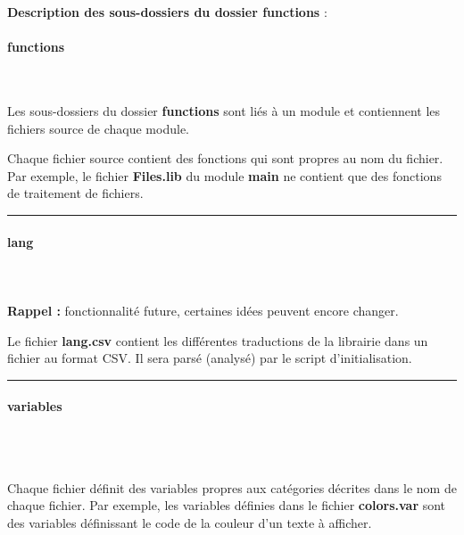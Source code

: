 \documentclass[a4paper,10pt]{article}
\begin{document}
\textbf{Description des sous-dossiers du dossier \textbf{functions}} :

\setcounter{secnumdepth}{4}
\paragraph{functions}\mbox{}\\

\begin{justify}
    Les sous-dossiers du dossier \textbf{functions} sont liés à un module et contiennent les fichiers source de chaque module.
\end{justify}

\begin{justify}
    Chaque fichier source contient des fonctions qui sont propres au nom du fichier. Par exemple, le fichier \textbf{\color{lime}Files.lib} du module \textbf{main} ne contient que des fonctions de traitement de fichiers.
\end{justify}


\par\noindent\rule{\textwidth}{0.4pt}

\paragraph{lang}\mbox{}\\\mbox{}\\

\textbf{Rappel :} fonctionnalité future, certaines idées peuvent encore changer.

\begin{justify}
    Le fichier \textbf{\color{lime}lang.csv} contient les différentes traductions de la librairie dans un fichier au format CSV. Il sera parsé (analysé) par le script d'initialisation.
\end{justify}


\par\noindent\rule{\textwidth}{0.4pt}

\paragraph{variables}\mbox{}\\\mbox{}\\

\begin{justify}
    Chaque fichier définit des variables propres aux catégories décrites dans le nom de chaque fichier. Par exemple, les variables définies dans le fichier \textbf{\color{lime}colors.var} sont des variables définissant le code de la couleur d'un texte à afficher.
\end{justify}
\end{document}
